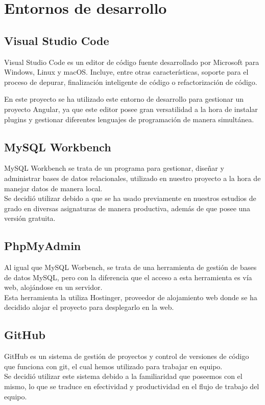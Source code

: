      \section{Entornos de desarrollo}
     
     \subsection{Visual Studio Code}
     Visual Studio Code\cite{vsc} es un editor de código fuente desarrollado por Microsoft para Windows, Linux y macOS. Incluye, entre otras características, soporte para el proceso de depurar, finalización inteligente de código o refactorización de código.
    \newline
    
    En este proyecto se ha utilizado este entorno de desarrollo para gestionar un proyecto Angular, ya que este editor posee gran versatilidad a la hora de instalar plugins y gestionar diferentes lenguajes de programación de manera simultánea.
    
     \subsection{MySQL Workbench}
     MySQL Workbench\cite{mysql} se trata de un programa para gestionar, diseñar y administrar bases de datos relacionales, utilizado en nuestro proyecto a la hora de manejar datos de manera local. \\
     \newline
     Se decidió utilizar debido a que se ha usado previamente en nuestros estudios de grado en diversas asignaturas de manera productiva, además de que posee una versión gratuita.
     
     \subsection{PhpMyAdmin}
     Al igual que MySQL Worbench, se trata de una herramienta de gestión de bases de datos MySQL, pero con la diferencia que el acceso a esta herramienta es vía web, alojándose en un servidor.\\
     \newline
     Esta herramienta la utiliza Hostinger\cite{hostinger},  proveedor de alojamiento web donde se ha decidido alojar el proyecto para desplegarlo en la web.
     
     \subsection{GitHub}
     GitHub\cite{github} es un sistema de gestión de proyectos y control de versiones de código que funciona con git, el cual hemos utilizado para trabajar en equipo. \\
     \newline
     Se decidió utilizar este sistema debido a la familiaridad que poseemos con el mismo, lo que se traduce en efectividad y productividad en el flujo de trabajo del equipo.
     
